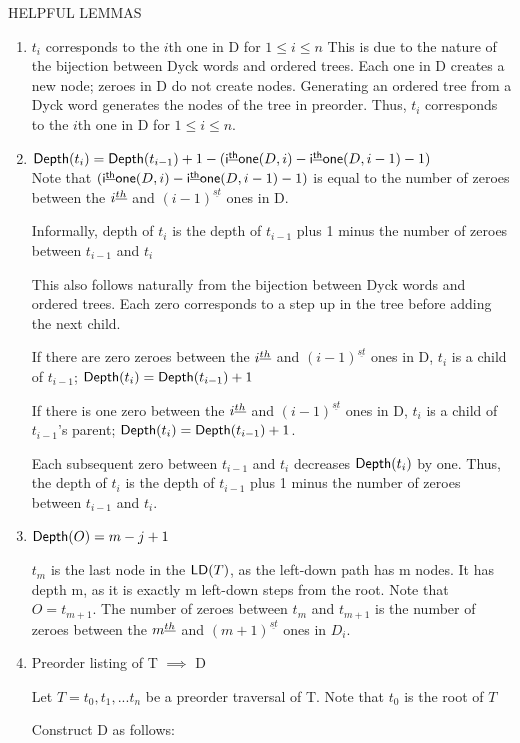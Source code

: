 HELPFUL LEMMAS
\begin{enumerate}
    \item $t_i$ corresponds to the $i$th one in D for $1 \le i \le n$
	This is due to the nature of the bijection between Dyck words and ordered trees.  Each one in D creates a new node; zeroes in D do not create nodes.  Generating an ordered tree from a Dyck word generates the nodes of the tree in preorder.  Thus, $t_i$ corresponds to the $i$th one in D for $1 \le i \le n$.
    \item $\mathsf{Depth}{(t_i)}=\mathsf{Depth}{(t_{i-1})}+1-(\mathsf{i^{\underline{th}}one}({D}, i)-\mathsf{i^{\underline{th}}one}({D}, i-1)-1)$ \\
	Note that $(\mathsf{i^{\underline{th}}one}({D}, i)-\mathsf{i^{\underline{th}}one}({D}, i-1)-1)$ is equal to the number of zeroes between the $i^{\underline{th}}$ and $(i-1)^{\underline{st}}$ ones in D.  


	Informally, depth of $t_i$ is the depth of $t_{i-1}$ plus 1 minus the number of zeroes between $t_{i-1}$ and $t_{i}$

	This also follows naturally from the bijection between Dyck words and ordered trees.  Each zero corresponds to a step up in the tree before adding the next child.  

	If there are zero zeroes between the $i^{\underline{th}}$  and $(i-1)^{\underline{st}}$ ones in D, $t_i$ is a child of $t_{i-1}$; $\mathsf{Depth}{(t_i)}=\mathsf{Depth}{(t_{i-1})}+1$

	If there is one zero between the $i^{\underline{th}}$  and $(i-1)^{\underline{st}}$ ones in D, $t_i$ is a child of $t_{i-1}$'s parent; $\mathsf{Depth}{(t_i)}=\mathsf{Depth}{(t_{i-1})}+1$.  

	Each subsequent zero between $t_{i-1}$ and $t_i$ decreases $\mathsf{Depth}{(t_{i})}$ by one.  Thus, the depth of $t_i$ is the depth of $t_{i-1}$ plus 1 minus the number of zeroes between $t_{i-1}$ and $t_{i}$.



    \item $\mathsf{Depth}{(O)}=m-j+1$

	$t_m$ is the last node in the $\mathsf{LD}{(T)}$, as the left-down path has m nodes. It has depth m, as it is exactly m left-down steps from the root.  Note that $O=t_{m+1}$.  The number of zeroes between $t_m$ and $t_{m+1}$ is the number of zeroes between the $m^{\underline{th}}$ and $(m+1)^{\underline{st}}$ ones in $D_i$.  

    \item Preorder listing of T $\implies $ D

	Let $T=t_0,t_1,...t_n$ be a preorder traversal of T.  Note that $t_0$ is the root of $T$

	Construct D as follows: 


\end{enumerate}
